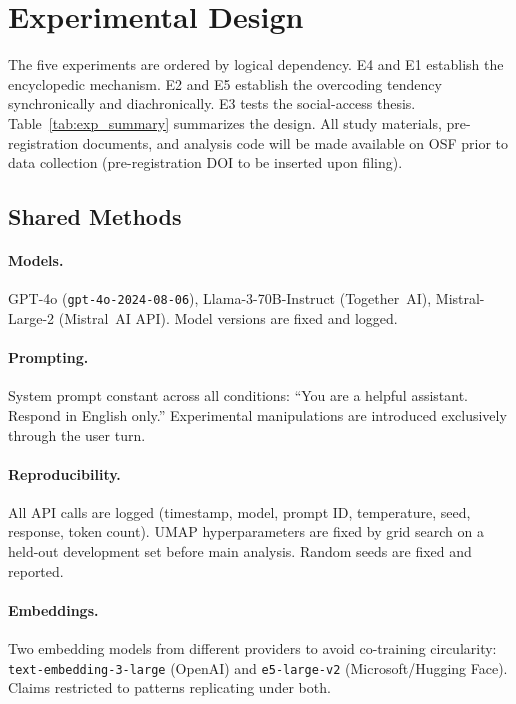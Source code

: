 \documentclass[12pt,a4paper]{article}
\begin{document}
\section{Experimental Design}
\label{sec:experiment}

The five experiments are ordered by logical dependency. E4 and E1 establish
the encyclopedic mechanism. E2 and E5 establish the overcoding tendency
synchronically and diachronically. E3 tests the social-access thesis.
Table~\ref{tab:exp_summary} summarizes the design. All study materials,
pre-registration documents, and analysis code will be made available on
OSF prior to data collection (pre-registration DOI to be inserted upon
filing).

\subsection{Shared Methods}
\label{sec:shared}

\paragraph{Models.} GPT-4o (\texttt{gpt-4o-2024-08-06}), Llama-3-70B-Instruct
(Together~AI), Mistral-Large-2 (Mistral~AI API). Model versions are fixed and
logged.

\paragraph{Prompting.} System prompt constant across all conditions:
``You are a helpful assistant. Respond in English only.'' Experimental
manipulations are introduced exclusively through the user turn.

\paragraph{Reproducibility.} All API calls are logged (timestamp, model,
prompt ID, temperature, seed, response, token count). UMAP hyperparameters
are fixed by grid search on a held-out development set before main analysis.
Random seeds are fixed and reported.

\paragraph{Embeddings.} Two embedding models from different providers to
avoid co-training circularity: \texttt{text-embedding-3-large} (OpenAI)
and \texttt{e5-large-v2} \citep{Wang2022} (Microsoft/Hugging Face).
Claims restricted to patterns replicating under both.
\end{document}
